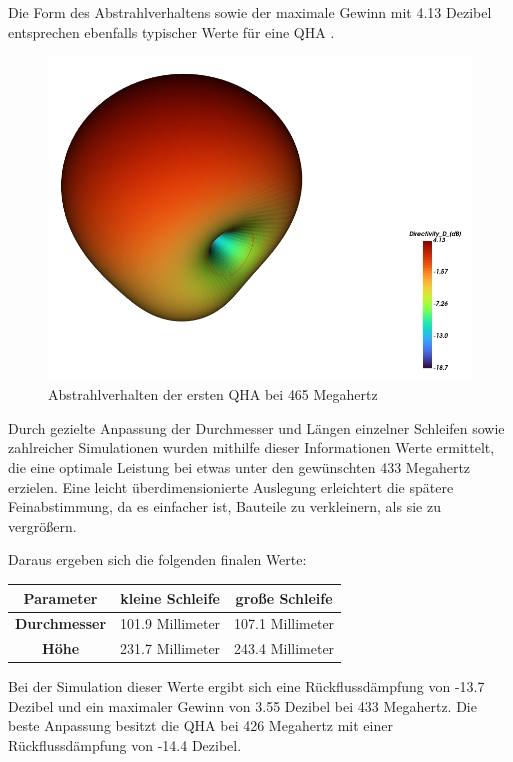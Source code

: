 Die Form des Abstrahlverhaltens sowie der maximale Gewinn mit 4.13 Dezibel entsprechen ebenfalls typischer Werte für eine QHA \cite{keller_quadrifilar_2015}.

\begin{figure} [H]
	\centering
	\includegraphics[width=.75\linewidth]{../ref/radiation_pattern_old_qfh.png}
	\caption{Abstrahlverhalten der ersten QHA bei 465 Megahertz}
	\label{fig:rp_old_qha}
\end{figure}

Durch gezielte Anpassung der Durchmesser und Längen einzelner Schleifen sowie zahlreicher Simulationen wurden mithilfe dieser Informationen Werte ermittelt, die eine optimale Leistung bei etwas unter den gewünschten 433 Megahertz erzielen. Eine leicht überdimensionierte Auslegung erleichtert die spätere Feinabstimmung, da es einfacher ist, Bauteile zu verkleinern, als sie zu vergrößern.

Daraus ergeben sich die folgenden finalen Werte:

\begin{center}
	\begin{tabular}{|c|c|c|}
		\hline
		\textbf{Parameter} & \textbf{kleine Schleife} & \textbf{große Schleife} \\
		\hline
		\textbf{Durchmesser} & 101.9 Millimeter & 107.1 Millimeter \\
		\hline
		\textbf{Höhe} & 231.7 Millimeter & 243.4 Millimeter \\
		\hline
	\end{tabular}
\end{center} 

Bei der Simulation dieser Werte ergibt sich eine Rückflussdämpfung von -13.7 Dezibel und ein maximaler Gewinn von 3.55 Dezibel bei 433 Megahertz. Die beste Anpassung besitzt die QHA bei 426 Megahertz mit einer Rückflussdämpfung von -14.4 Dezibel.

